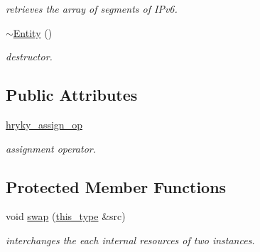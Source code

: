 \begin{DoxyCompactItemize}
\begin{DoxyCompactList}\small\item\em retrieves the array of segments of I\-Pv6. \end{DoxyCompactList}\item 
\hypertarget{classhryky_1_1ip_1_1v6_1_1_entity_aa1d88a6a7bd07af1048d9ed5f73802fb}{\hyperlink{classhryky_1_1ip_1_1v6_1_1_entity_aa1d88a6a7bd07af1048d9ed5f73802fb}{$\sim$\-Entity} ()}\label{classhryky_1_1ip_1_1v6_1_1_entity_aa1d88a6a7bd07af1048d9ed5f73802fb}

\begin{DoxyCompactList}\small\item\em destructor. \end{DoxyCompactList}\end{DoxyCompactItemize}
\subsection*{Public Attributes}
\begin{DoxyCompactItemize}
\item 
\hypertarget{classhryky_1_1ip_1_1v6_1_1_entity_aa4b0a394780af1750abcb95dc5a18809}{\hyperlink{classhryky_1_1ip_1_1v6_1_1_entity_aa4b0a394780af1750abcb95dc5a18809}{hryky\-\_\-assign\-\_\-op}}\label{classhryky_1_1ip_1_1v6_1_1_entity_aa4b0a394780af1750abcb95dc5a18809}

\begin{DoxyCompactList}\small\item\em assignment operator. \end{DoxyCompactList}\end{DoxyCompactItemize}
\subsection*{Protected Member Functions}
\begin{DoxyCompactItemize}
\item 
\hypertarget{classhryky_1_1ip_1_1v6_1_1_entity_a788258640489d598be0473c0f2194de7}{void \hyperlink{classhryky_1_1ip_1_1v6_1_1_entity_a788258640489d598be0473c0f2194de7}{swap} (\hyperlink{classhryky_1_1ip_1_1v6_1_1_entity_a2d767b52e28cf8fea606e918d13bfbd7}{this\-\_\-type} \&src)}\label{classhryky_1_1ip_1_1v6_1_1_entity_a788258640489d598be0473c0f2194de7}

\begin{DoxyCompactList}\small\item\em interchanges the each internal resources of two instances. \end{DoxyCompactList}\end{DoxyCompactItemize}


